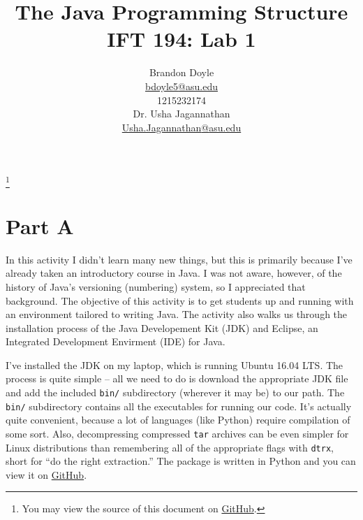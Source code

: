 \documentclass[leqno, 11pt]{article}
\title{\vspace{6ex}The Java Programming Structure\\
  \Large IFT 194: Lab 1}
\author{Brandon Doyle\\
\href{mailto:bdoyle@asu.edu}{bdoyle5\mbox{}{\fontfamily{ptm}\selectfont @}\mbox{}asu.edu}\\
1215232174\\[1em]
Dr. Usha Jagannathan\\
\href{mailto:Usha.Jagannathan@asu.edu}{Usha.Jagannathan\mbox{}{\fontfamily{ptm}\selectfont @}\mbox{}asu.edu}}
\newcommand\blfootnote[1]{%
  \begingroup
    \renewcommand\thefootnote{}\footnote{#1}
    \addtocounter{footnote}{-1}
  \endgroup
}
\begin{document}
\begin{titlepage}
\clearpage\maketitle
\thispagestyle{empty}
\end{titlepage}
\blfootnote{You may view the source of this document on \href{https://github.com/bjd2385/IFT_194_labs/blob/master/lab_1.tex}{GitHub}.}
\section*{Part A}
In this activity I didn't learn many new things, but this is primarily because I've already taken an introductory course in Java. I was not aware, however, of the history of Java's versioning (numbering) system, so I appreciated that background. The objective of this activity is to get students up and running with an environment tailored to writing Java. The activity also walks us through the installation process of the Java Developement Kit (JDK) and Eclipse, an Integrated Development Envirment (IDE) for Java.

I've installed the JDK on my laptop, which is running Ubuntu 16.04 LTS. The process is quite simple -- all we need to do is download the appropriate JDK file and add the included \texttt{bin/} subdirectory (wherever it may be) to our path. The \texttt{bin/} subdirectory contains all the executables for running our code. It's actually quite convenient, because a lot of languages (like  Python) require compilation of some sort. Also, decompressing compressed \texttt{tar} archives can be even simpler for Linux distributions than remembering all of the appropriate flags with \texttt{dtrx}, short for ``do the right extraction.'' The package is written in Python and you can view it on \href{https://github.com/moonpyk/dtrx}{GitHub}.
\end{document}

